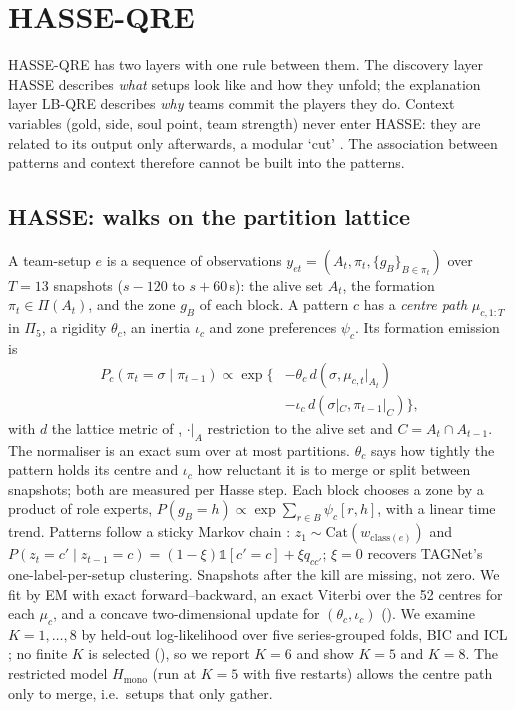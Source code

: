 \section{HASSE-QRE}
\label{sec:model}

HASSE-QRE has two layers with one rule between them.
The discovery layer HASSE describes \emph{what} setups look like and how they unfold; the explanation layer LB-QRE describes \emph{why} teams commit the players they do.
Context variables (gold, side, soul point, team strength) never enter HASSE: they are related to its output only afterwards, a modular `cut' \citep{plummer2015cuts}.
The association between patterns and context therefore cannot be built into the patterns.

\subsection{HASSE: walks on the partition lattice}

A team-setup $e$ is a sequence of observations $y_{et}=(A_t,\pi_t,\{g_B\}_{B\in\pi_t})$ over $T=13$ snapshots ($s{-}120$ to $s{+}60$\,s): the alive set $A_t$, the formation $\pi_t\in\Pi(A_t)$, and the zone $g_B$ of each block.
A pattern $c$ has a \emph{centre path} $\mu_{c,1:T}$ in $\Pi_5$, a rigidity $\theta_c$, an inertia $\iota_c$ and zone preferences $\psi_c$.
Its formation emission is
\begin{equation}
\begin{split}
P_c(\pi_t=\sigma\mid\pi_{t-1})\propto\exp\{&-\theta_c\, d(\sigma,\mu_{c,t}|_{A_t})\\
&-\iota_c\, d(\sigma|_C,\pi_{t-1}|_C)\},
\end{split}
\label{eq:hasse}
\end{equation}
with $d$ the lattice metric of , $\cdot|_A$ restriction to the alive set and $C=A_t\cap A_{t-1}$.
The normaliser is an exact sum over at most  partitions.
$\theta_c$ says how tightly the pattern holds its centre and $\iota_c$ how reluctant it is to merge or split between snapshots; both are measured per Hasse step.
Each block chooses a zone by a product of role experts, $P(g_B=h)\propto\exp\sum_{r\in B}\psi_c[r,h]$, with a linear time trend.
Patterns follow a sticky Markov chain \citep{fox2011sticky}: $z_1\sim\mathrm{Cat}(w_{\mathrm{class}(e)})$ and $P(z_t=c'\mid z_{t-1}=c)=(1-\xi)\mathbb{1}[c'=c]+\xi q_{cc'}$; $\xi=0$ recovers TAGNet's one-label-per-setup clustering.
Snapshots after the kill are missing, not zero.
We fit by EM with exact forward--backward, an exact Viterbi over the 52 centres for each $\mu_c$, and a concave two-dimensional update for $(\theta_c,\iota_c)$ ().
We examine $K=1,\dots,8$ by held-out log-likelihood over five series-grouped folds, BIC and ICL \citep{biernacki2000assessing}; no finite $K$ is selected (), so we report $K=6$ and show $K=5$ and $K=8$.
The restricted model $H_{\mathrm{mono}}$ (run at $K=5$ with five restarts) allows the centre path only to merge, i.e.\ setups that only gather.

